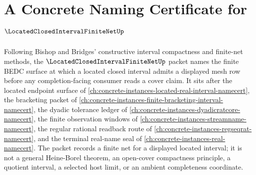 \chapter{A Concrete Naming Certificate for $\LocatedClosedIntervalFiniteNetUp$}
\label{ch:concrete-instances-located-closed-interval-finite-net-namecert}

Following Bishop and Bridges' constructive interval compactness and finite-net methods, the $\LocatedClosedIntervalFiniteNetUp$ packet names the finite BEDC surface at which a located closed interval admits a displayed mesh row before any completion-facing consumer reads a cover claim. It sits after the located endpoint surface of \autoref{ch:concrete-instances-located-real-interval-namecert}, the bracketing packet of \autoref{ch:concrete-instances-finite-bracketing-interval-namecert}, the dyadic tolerance ledger of \autoref{ch:concrete-instances-dyadicratcore-namecert}, the finite observation windows of \autoref{ch:concrete-instances-streamname-namecert}, the regular rational readback route of \autoref{ch:concrete-instances-regseqrat-namecert}, and the terminal real-name seal of \autoref{ch:concrete-instances-real-namecert}. The packet records a finite net for a displayed located interval; it is not a general Heine-Borel theorem, an open-cover compactness principle, a quotient interval, a selected host limit, or an ambient completeness coordinate.

